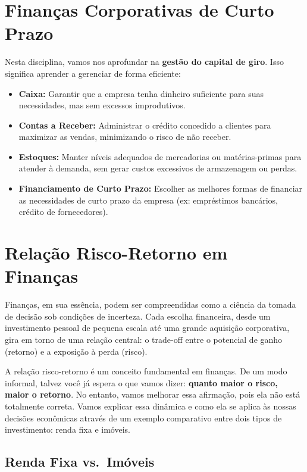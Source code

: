 \documentclass[
  a4paper,
]{book}
\begin{document}
\section{Finanças Corporativas de Curto
Prazo}\label{finanuxe7as-corporativas-de-curto-prazo}

Nesta disciplina, vamos nos aprofundar na \textbf{gestão do capital de
giro}. Isso significa aprender a gerenciar de forma eficiente:

\begin{itemize}
\item
  \textbf{Caixa:} Garantir que a empresa tenha dinheiro suficiente para
  suas necessidades, mas sem excessos improdutivos.
\item
  \textbf{Contas a Receber:} Administrar o crédito concedido a clientes
  para maximizar as vendas, minimizando o risco de não receber.
\item
  \textbf{Estoques:} Manter níveis adequados de mercadorias ou
  matérias-primas para atender à demanda, sem gerar custos excessivos de
  armazenagem ou perdas.
\item
  \textbf{Financiamento de Curto Prazo:} Escolher as melhores formas de
  financiar as necessidades de curto prazo da empresa (ex: empréstimos
  bancários, crédito de fornecedores).
\end{itemize}

\section{Relação Risco-Retorno em
Finanças}\label{relauxe7uxe3o-risco-retorno-em-finanuxe7as}

Finanças, em sua essência, podem ser compreendidas como a ciência da
tomada de decisão sob condições de incerteza. Cada escolha financeira,
desde um investimento pessoal de pequena escala até uma grande aquisição
corporativa, gira em torno de uma relação central: o trade-off entre o
potencial de ganho (retorno) e a exposição à perda (risco).

A relação risco-retorno é um conceito fundamental em finanças. De um
modo informal, talvez você já espera o que vamos dizer: \textbf{quanto
maior o risco, maior o retorno}. No entanto, vamos melhorar essa
afirmação, pois ela não está totalmente correta. Vamos explicar essa
dinâmica e como ela se aplica às nossas decisões econômicas através de
um exemplo comparativo entre dois tipos de investimento: renda fixa e
imóveis.

\subsection{Renda Fixa vs.~Imóveis}\label{renda-fixa-vs.-imuxf3veis}
\end{document}
